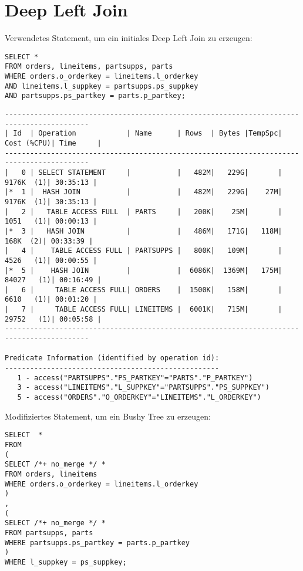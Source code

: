 \documentclass[10pt]{article}
\begin{document}
\section{Deep Left Join}
Verwendetes Statement, um ein initiales Deep Left Join zu erzeugen:
\begin{lstlisting}[style=sql]
SELECT *
FROM orders, lineitems, partsupps, parts
WHERE orders.o_orderkey = lineitems.l_orderkey
AND lineitems.l_suppkey = partsupps.ps_suppkey
AND partsupps.ps_partkey = parts.p_partkey;
\end{lstlisting}
\begin{lstlisting}[style=queryexecutionplan]
------------------------------------------------------------------------------------------
| Id  | Operation            | Name      | Rows  | Bytes |TempSpc| Cost (%CPU)| Time     |
------------------------------------------------------------------------------------------
|   0 | SELECT STATEMENT     |           |   482M|   229G|       |  9176K  (1)| 30:35:13 |
|*  1 |  HASH JOIN           |           |   482M|   229G|    27M|  9176K  (1)| 30:35:13 |
|   2 |   TABLE ACCESS FULL  | PARTS     |   200K|    25M|       |  1051   (1)| 00:00:13 |
|*  3 |   HASH JOIN          |           |   486M|   171G|   118M|   168K  (2)| 00:33:39 |
|   4 |    TABLE ACCESS FULL | PARTSUPPS |   800K|   109M|       |  4526   (1)| 00:00:55 |
|*  5 |    HASH JOIN         |           |  6086K|  1369M|   175M| 84027   (1)| 00:16:49 |
|   6 |     TABLE ACCESS FULL| ORDERS    |  1500K|   158M|       |  6610   (1)| 00:01:20 |
|   7 |     TABLE ACCESS FULL| LINEITEMS |  6001K|   715M|       | 29752   (1)| 00:05:58 |
------------------------------------------------------------------------------------------

Predicate Information (identified by operation id):
---------------------------------------------------
   1 - access("PARTSUPPS"."PS_PARTKEY"="PARTS"."P_PARTKEY")
   3 - access("LINEITEMS"."L_SUPPKEY"="PARTSUPPS"."PS_SUPPKEY")
   5 - access("ORDERS"."O_ORDERKEY"="LINEITEMS"."L_ORDERKEY")
\end{lstlisting}
Modifiziertes Statement, um ein Bushy Tree zu erzeugen:
\begin{lstlisting}[style=sql]
SELECT  *
FROM 
(
SELECT /*+ no_merge */ *
FROM orders, lineitems
WHERE orders.o_orderkey = lineitems.l_orderkey
)
,
(
SELECT /*+ no_merge */ *
FROM partsupps, parts
WHERE partsupps.ps_partkey = parts.p_partkey
)
WHERE l_suppkey = ps_suppkey;
\end{lstlisting}
\end{document}
